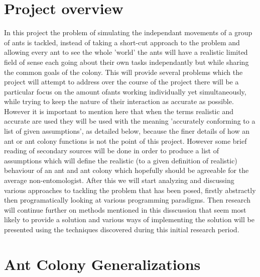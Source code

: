 \documentclass{report}
\begin{document}
\section{Project overview}
In this project the problem of simulating the independant movements of a group of ants is tackled, instead of taking a short-cut approach to the problem and allowing every ant to see the whole 'world' the ants will have a realistic limited field of sense each going about their own tasks independantly but while sharing the common goals of the colony. This will provide several problems which the project will attempt to address over the course of the project there will be a particular focus on the amount ofants working individually yet simultaneously, while trying to keep the nature of their interaction as accurate as possible. However it is important to mention here that when  the terms realistic and accurate are used they will be used with the meaning 'accurately conforming to a list of given assumptions', as detailed below, because the finer details of how an ant or ant colony functions is not the point of this project. However some brief reading of secondary sources will be done in order to produce a list of assumptions which will define the realistic (to a given definition of realistic) behaviour of an ant and ant colony which hopefully should be agreeable for the average non-entomologist. After this we will start analyzing and discussing various approaches to tackling the problem that has been posed, firstly abstractly then programatically looking at various programming paradigms. Then research will continue further on methods mentioned in this disscussion that seem most likely to provide a solution and various ways of implementing the solution will be presented using the techniques discovered during this initial research period. 

\section{Ant Colony Generalizations}
\end{document}
